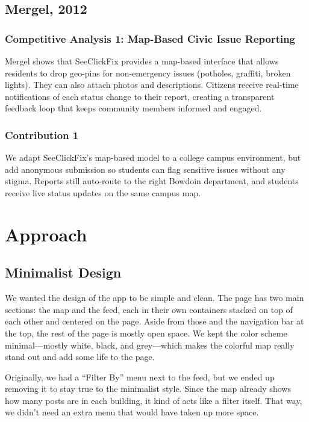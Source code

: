 \documentclass{article}
\begin{document}
\subsection{Mergel, 2012\cite{mergel_distributed_2012}}
\subsubsection*{Competitive Analysis 1: Map-Based Civic Issue Reporting}
Mergel shows that SeeClickFix provides a map-based interface that allows residents to drop geo-pins for non-emergency issues (potholes, graffiti, broken lights). They can also attach photos and descriptions. Citizens receive real-time notifications of each status change to their report, creating a transparent feedback loop that keeps community members informed and engaged.


\subsubsection*{Contribution 1}
We adapt SeeClickFix’s map-based model to a college campus environment, but add anonymous submission so students can flag sensitive issues without any stigma. Reports still auto-route to the right Bowdoin department, and students receive live status updates on the same campus map. 


\newpage

\section{Approach}

\subsection{Minimalist Design}

We wanted the design of the app to be simple and clean. The page has two main sections: the map and the feed, each in their own containers stacked on top of each other and centered on the page. Aside from those and the navigation bar at the top, the rest of the page is mostly open space. We kept the color scheme minimal—mostly white, black, and grey—which makes the colorful map really stand out and add some life to the page.

Originally, we had a “Filter By” menu next to the feed, but we ended up removing it to stay true to the minimalist style. Since the map already shows how many posts are in each building, it kind of acts like a filter itself. That way, we didn’t need an extra menu that would have taken up more space.
\end{document}
